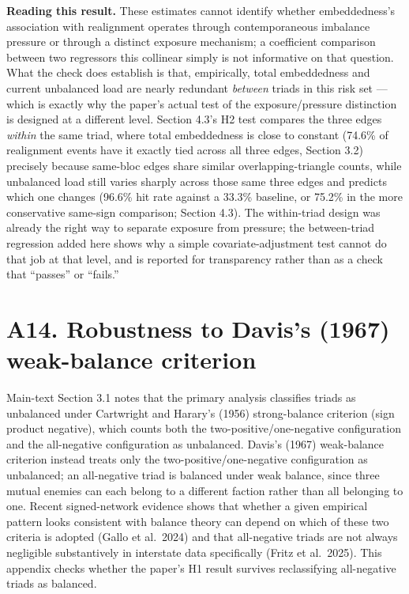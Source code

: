 \documentclass[Afour,sageh,times,doublespace]{sagej}
\begin{document}
\textbf{Reading this result.} These estimates cannot identify whether embeddedness's association with realignment operates through contemporaneous imbalance pressure or through a distinct exposure mechanism; a coefficient comparison between two regressors this collinear simply is not informative on that question. What the check does establish is that, empirically, total embeddedness and current unbalanced load are nearly redundant \emph{between} triads in this risk set --- which is exactly why the paper's actual test of the exposure/pressure distinction is designed at a different level. Section 4.3's H2 test compares the three edges \emph{within} the same triad, where total embeddedness is close to constant (74.6\% of realignment events have it exactly tied across all three edges, Section 3.2) precisely because same-bloc edges share similar overlapping-triangle counts, while unbalanced load still varies sharply across those same three edges and predicts which one changes (96.6\% hit rate against a 33.3\% baseline, or 75.2\% in the more conservative same-sign comparison; Section 4.3). The within-triad design was already the right way to separate exposure from pressure; the between-triad regression added here shows why a simple covariate-adjustment test cannot do that job at that level, and is reported for transparency rather than as a check that ``passes'' or ``fails.''

\section*{A14. Robustness to Davis's (1967) weak-balance criterion}

Main-text Section 3.1 notes that the primary analysis classifies triads as unbalanced under Cartwright and Harary's (1956) strong-balance criterion (sign product negative), which counts both the two-positive/one-negative configuration and the all-negative configuration as unbalanced. Davis's (1967) weak-balance criterion instead treats only the two-positive/one-negative configuration as unbalanced; an all-negative triad is balanced under weak balance, since three mutual enemies can each belong to a different faction rather than all belonging to one. Recent signed-network evidence shows that whether a given empirical pattern looks consistent with balance theory can depend on which of these two criteria is adopted (Gallo et al.~2024) and that all-negative triads are not always negligible substantively in interstate data specifically (Fritz et al.~2025). This appendix checks whether the paper's H1 result survives reclassifying all-negative triads as balanced.
\end{document}
